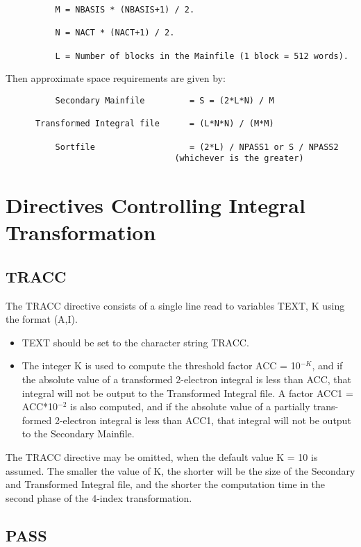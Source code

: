 \documentclass[11pt,fleqn]{article}
\begin{document}
{
\footnotesize
\begin{verbatim}
          M = NBASIS * (NBASIS+1) / 2.

          N = NACT * (NACT+1) / 2.

          L = Number of blocks in the Mainfile (1 block = 512 words).
\end{verbatim}
}
Then   approximate space requirements are given by:
{
\footnotesize
\begin{verbatim}
          Secondary Mainfile         = S = (2*L*N) / M

      Transformed Integral file      = (L*N*N) / (M*M)

          Sortfile                   = (2*L) / NPASS1 or S / NPASS2
                                  (whichever is the greater)
\end{verbatim}
}

\section[Directives Controlling Integral Transformation]{Directives Controlling Integral Transformation}

\subsection[TRACC]{TRACC}

The TRACC directive consists of a single line read to variables TEXT, K
using the format (A,I).
\begin{itemize}
\item  TEXT should be set to the character string TRACC.
\item  The integer K is used to compute the threshold factor 
ACC = 10$^{-K}$, and if the
absolute value of a transformed 2-electron integral is
less than ACC, that integral will not be output to the
Transformed Integral file. A factor ACC1 = ACC*10$^{-2}$ is also
computed, and if the absolute value of a partially trans-formed 
2-electron integral is less than ACC1, that
integral will not be output to the Secondary Mainfile.
\end{itemize}
The TRACC directive may be omitted, when the default value K = 10 is
assumed. The smaller the value of K, the shorter will be the size of
the Secondary and Transformed Integral file, 
and the shorter the computation time
in the second phase of the 4-index transformation.

\subsection[PASS]{PASS}
\end{document}
